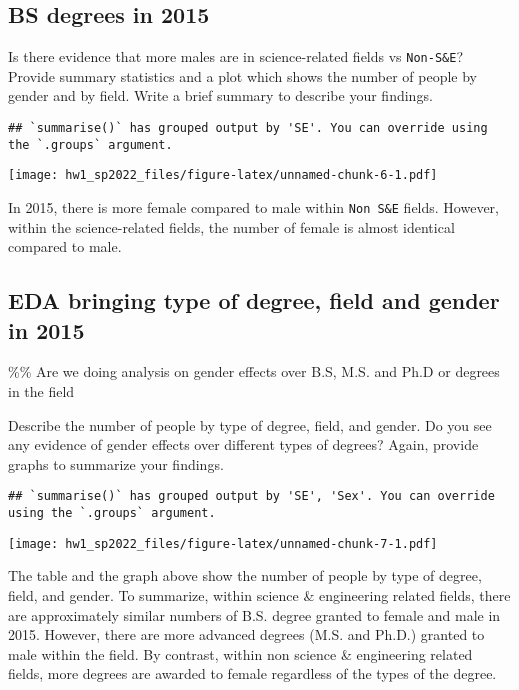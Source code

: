 \documentclass[
]{article}
\begin{document}
\hypertarget{bs-degrees-in-2015}{%
\subsection{BS degrees in 2015}\label{bs-degrees-in-2015}}

Is there evidence that more males are in science-related fields vs
\texttt{Non-S\&E}? Provide summary statistics and a plot which shows the
number of people by gender and by field. Write a brief summary to
describe your findings.

\begin{verbatim}
## `summarise()` has grouped output by 'SE'. You can override using the `.groups` argument.
\end{verbatim}

\texttt{[image: hw1\_sp2022\_files/figure-latex/unnamed-chunk-6-1.pdf]}

In 2015, there is more female compared to male within \texttt{Non\ S\&E}
fields. However, within the science-related fields, the number of female
is almost identical compared to male.

\hypertarget{eda-bringing-type-of-degree-field-and-gender-in-2015}{%
\subsection{EDA bringing type of degree, field and gender in
2015}\label{eda-bringing-type-of-degree-field-and-gender-in-2015}}

\%\% Are we doing analysis on gender effects over B.S, M.S. and Ph.D or
degrees in the field

Describe the number of people by type of degree, field, and gender. Do
you see any evidence of gender effects over different types of degrees?
Again, provide graphs to summarize your findings.

\begin{verbatim}
## `summarise()` has grouped output by 'SE', 'Sex'. You can override using the `.groups` argument.
\end{verbatim}

\texttt{[image: hw1\_sp2022\_files/figure-latex/unnamed-chunk-7-1.pdf]}

The table and the graph above show the number of people by type of
degree, field, and gender. To summarize, within science \& engineering
related fields, there are approximately similar numbers of B.S. degree
granted to female and male in 2015. However, there are more advanced
degrees (M.S. and Ph.D.) granted to male within the field. By contrast,
within non science \& engineering related fields, more degrees are
awarded to female regardless of the types of the degree.
\end{document}
